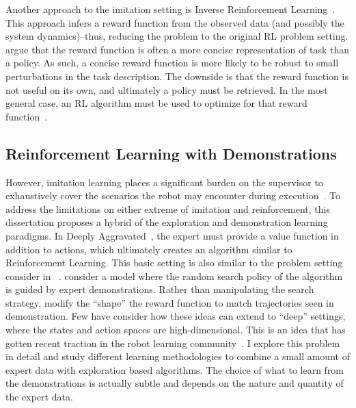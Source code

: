 Another approach to the imitation setting is Inverse Reinforcement Learning~\cite{abbeel2011inverse,ziebart2008maximum,ng2000algorithms}. This approach infers a reward function from the observed data (and possibly the system dynamics)--thus, reducing the problem to the original RL problem setting. \cite{abbeel2004apprenticeship} argue that the reward function is often a more concise representation of task than a policy. As such, a concise reward function is more likely to be robust to small perturbations in the task description. 
The downside is that the reward function is not useful on its own, and ultimately a policy must be retrieved. In the most general case, an RL algorithm must be used to optimize for that reward function~\cite{abbeel2004apprenticeship}.

\subsection{Reinforcement Learning with Demonstrations}
However, imitation learning places a significant burden on the supervisor to exhaustively cover the scenarios the robot may encounter during execution~\cite{laskey2017iterative}.
To address the limitations on either extreme of imitation and reinforcement, this dissertation proposes a hybrid of the exploration and demonstration learning paradigms. 
In Deeply Aggravated~\cite{sun2017deeply},  the expert must provide a value function in addition to actions, which ultimately creates an algorithm similar to Reinforcement Learning.
This basic setting is also similar to the problem setting consider in ~\cite{piot2014boosted}.
\cite{subramanian2016exploration} consider a model where the random search policy of the algorithm is guided by expert demonstrations.
Rather than manipulating the search strategy, \cite{brys2015reinforcement} modify the ``shape'' the reward function to match trajectories seen in demonstration.
Few have consider how these ideas can extend to ``deep'' settings, where the states and action spaces are high-dimensional.
This is an idea that has gotten recent traction in the robot learning community~\cite{duan2017one, james2017transferring, hester2017deep}. 
I explore this problem in detail and study different learning methodologies to combine a small amount of expert data with exploration based algorithms. The choice of what to learn from the demonstrations is actually subtle and depends on the nature and quantity of the expert data.